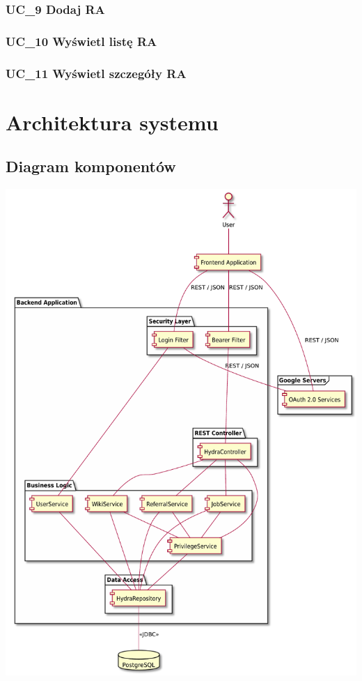 \documentclass[oneside]{scrreprt}
\begin{document}
\subsection{UC\_9 Dodaj RA}
\subsection{UC\_10 Wyświetl listę RA}
\subsection{UC\_11 Wyświetl szczegóły RA}

\chapter{Architektura systemu}

\section{Diagram komponentów}
\includegraphics[width=\textwidth, keepaspectratio]{graphics/hydra_component_diagram.pdf}
\end{document}
